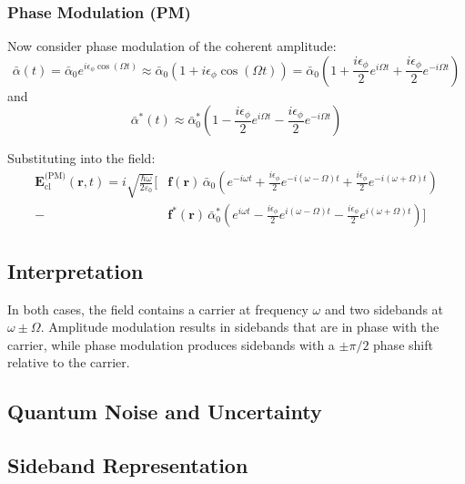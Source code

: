 \subsubsection*{Phase Modulation (PM)}

Now consider phase modulation of the coherent amplitude:
\begin{equation}
    \bar{\alpha}(t) = \bar{\alpha}_0 e^{i \epsilon_\phi \cos(\Omega t)}
    \approx \bar{\alpha}_0 \left(1 + i \epsilon_\phi \cos(\Omega t)\right)
    = \bar{\alpha}_0 \left(1 + \frac{i \epsilon_\phi}{2} e^{i\Omega t} + \frac{i \epsilon_\phi}{2} e^{-i\Omega t} \right)
\end{equation}
and
\begin{equation}
    \bar{\alpha}^*(t) \approx \bar{\alpha}_0^* \left(1 - \frac{i \epsilon_\phi}{2} e^{i\Omega t} - \frac{i \epsilon_\phi}{2} e^{-i\Omega t} \right)
\end{equation}

Substituting into the field:
\begin{align}
    \mathbf{E}_{\text{cl}}^{\text{(PM)}}(\mathbf{r}, t) =
    i \sqrt{\frac{\hbar \omega}{2 \varepsilon_0}} \Big[
    &\mathbf{f}(\mathbf{r})\, \bar{\alpha}_0 \left( e^{-i\omega t} + \frac{i \epsilon_\phi}{2} e^{-i(\omega - \Omega)t} + \frac{i \epsilon_\phi}{2} e^{-i(\omega + \Omega)t} \right) \nonumber \\
    - &\mathbf{f}^*(\mathbf{r})\, \bar{\alpha}_0^* \left( e^{i\omega t} - \frac{i \epsilon_\phi}{2} e^{i(\omega - \Omega)t} - \frac{i \epsilon_\phi}{2} e^{i(\omega + \Omega)t} \right)
    \Big]
\end{align}

\subsection*{Interpretation}

In both cases, the field contains a carrier at frequency $\omega$ and two sidebands at $\omega \pm \Omega$. Amplitude modulation results in sidebands that are in phase with the carrier, while phase modulation produces sidebands with a $\pm \pi/2$ phase shift relative to the carrier.

\subsection{Quantum Noise and Uncertainty}
\subsection{Sideband Representation}
\hspace{1pt}

